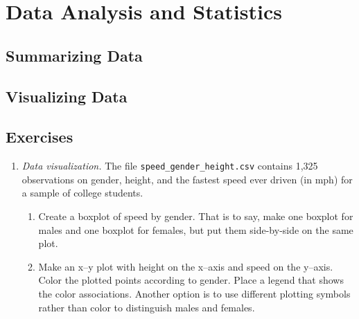\chapter{Data Analysis and Statistics}

\section{Summarizing Data}

\section{Visualizing Data}

\section{Exercises}

\begin{enumerate}


\item \emph{Data visualization.} The file
  \texttt{speed\_gender\_height.csv} contains 1,325 observations on
  gender, height, and the fastest speed ever driven (in mph) for a
  sample of college students.

\begin{enumerate}
\item Create a boxplot of speed by gender. That is to say, make one
  boxplot for males and one boxplot for females, but put them
  side-by-side on the same plot.
\item Make an x--y plot with height on the x--axis and speed on the
  y--axis. Color the plotted points according to gender. Place a
  legend that shows the color associations. Another option is to use
  different plotting symbols rather than color to distinguish males
  and females.
\end{enumerate}

\end{enumerate}
